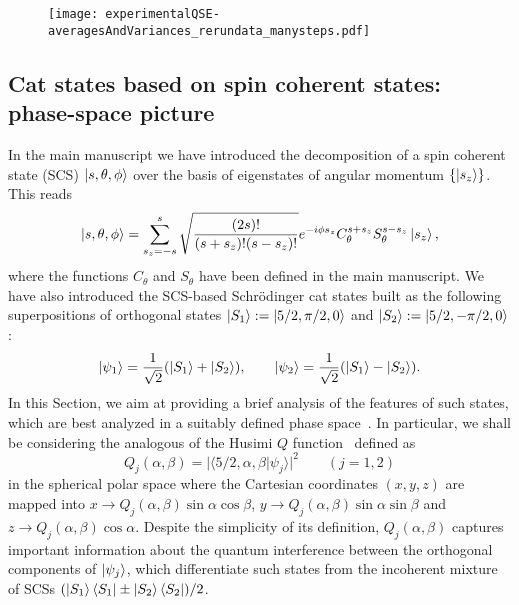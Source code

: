 \begin{figure}[ht!]
    \centering
    \texttt{[image: experimentalQSE-averagesAndVariances\_rerundata\_manysteps.pdf]}
    \caption{}
    \label{fig:avgProbabilitiesVsStepNumber}
\end{figure}




\vspace{1em}
\subsection{Cat states based on spin coherent states: phase-space picture}

In the main manuscript we have introduced the decomposition of a spin coherent state (SCS) $\ket{s,\theta,\phi}$ over the basis of eigenstates of angular momentum $\{\ket{s_z}\}$. This reads
\begin{equation}
\ket{s,\theta,\phi}=\sum^s_{s_z=-s}\sqrt{\frac{(2s)!}{(s+s_z)!(s-s_z)!}}e^{-i\phi s_z}C^{s+s_z}_\theta S^{s-s_z}_\theta\ket{s_z},
\end{equation}
where the functions $C_{\theta}$ and $S_\theta$ have been defined in the main manuscript. We have also introduced the SCS-based Schr{\"o}dinger cat states built as the following superpositions of orthogonal states $\ket{S_1}:=\ket{5/2,\pi/2,0}$ and $\ket{S_2}:=\ket{5/2,-\pi/2,0}$:
\begin{equation}
\ket{\psi_{1}}=\frac{1}{\sqrt 2}(\ket{S_1}+\ket{S_2}),\qquad\ket{\psi_{2}}=\frac{1}{\sqrt 2}(\ket{S_1}-\ket{S_2}).
\end{equation}
In this Section, we aim at providing a brief analysis of the features of such states, which are best analyzed in a suitably defined phase space~\cite{agarwalCAT1997}. In particular, we shall be considering the analogous of the Husimi $Q$ function~\cite{WM} defined as
\begin{equation}
\label{deco}
Q_j(\alpha,\beta)=\vert\langle{5/2,\alpha,\beta}\vert\psi_j\rangle\vert^2\qquad(j=1,2)
\end{equation}
in the spherical polar space where the Cartesian coordinates $(x,y,z)$ are mapped into $x\to Q_j(\alpha,\beta)\sin\alpha\cos\beta$, $y\to Q_j(\alpha,\beta)\sin\alpha\sin\beta$ and $z\to Q_j(\alpha,\beta)\cos\alpha$. Despite the simplicity of its definition, $Q_j(\alpha,\beta)$ captures important information about the quantum interference between the orthogonal components of $\ket{\psi_{j}}$, which differentiate such states from the incoherent mixture of SCSs $(\ket{S_1}\bra{S_1}\pm\ket{S_2}\bra{S_2})/2$. 

